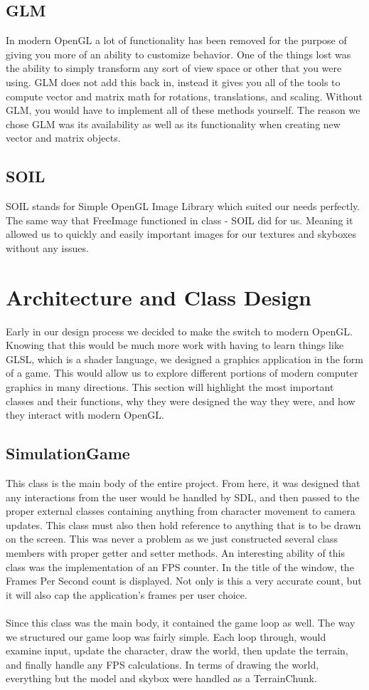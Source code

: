 \documentclass[paper=a4, fontsize=11pt]{scrartcl}
\numberwithin{equation}{section}		%
\numberwithin{figure}{section}			%
\numberwithin{table}{section}				%
\begin{document}
\subsection{GLM}
In modern OpenGL a lot of functionality has been removed for the purpose of giving you more of an ability to customize behavior. One of the things lost was the ability to simply transform any sort of view space or other that you were using. GLM does not add this back in, instead it gives you all of the tools to compute vector and matrix math for rotations, translations, and scaling. Without GLM, you would have to implement all of these methods yourself. The reason we chose GLM was its availability as well as its functionality when creating new vector and matrix objects.
\subsection{SOIL}
SOIL stands for Simple OpenGL Image Library which suited our needs perfectly. The same way that FreeImage functioned in class - SOIL did for us. Meaning it allowed us to quickly and easily important images for our textures and skyboxes without any issues.

\section{Architecture and Class Design}
Early in our design process we decided to make the switch to modern OpenGL. Knowing that this would be much more work with having to learn things like GLSL, which is a shader language, we designed a graphics application in the form of a game. This would allow us to explore different portions of modern computer graphics in many directions. This section will highlight the most important classes and their functions, why they were designed the way they were, and how they interact with modern OpenGL.
\subsection{SimulationGame}
This class is the main body of the entire project. From here, it was designed that any interactions from the user would be handled by SDL, and then passed to the proper external classes containing anything from character movement to camera updates. This class must also then hold reference to anything that is to be drawn on the screen. This was never a problem as we just constructed several class members with proper getter and setter methods. An interesting ability of this class was the implementation of an FPS counter. In the title of the window, the Frames Per Second count is displayed. Not only is this a very accurate count, but it will also cap the application's frames per user choice.
\\ \\
Since this class was the main body, it contained the game loop as well. The way we structured our game loop was fairly simple. Each loop through, would examine input, update the character, draw the world, then update the terrain, and finally handle any FPS calculations. In terms of drawing the world, everything but the model and skybox were handled as a TerrainChunk.
\end{document}
